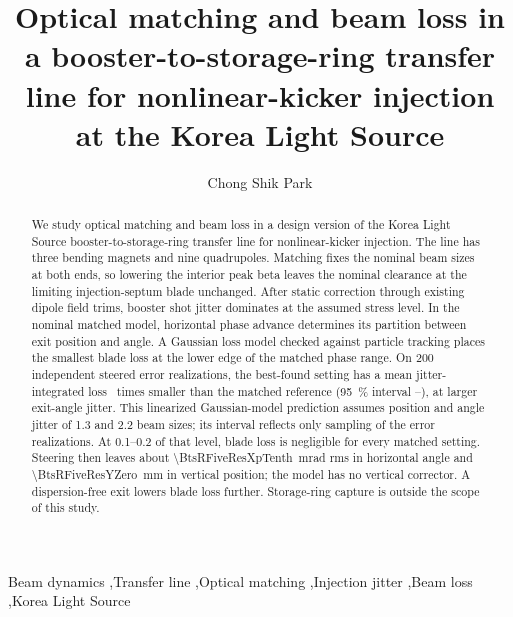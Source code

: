 \documentclass[final,5p,twocolumn]{elsarticle}
\begin{document}
\begin{frontmatter}
\title{Optical matching and beam loss in a booster-to-storage-ring transfer line for nonlinear-kicker injection at the Korea Light Source}
\author[department,center]{Chong Shik Park}
\address[department]{Department of Accelerator Science, Korea University, Sejong, 30019, Republic of Korea}
\address[center]{Center for Accelerator Research, Korea University, Sejong, 30019, Republic of Korea}
\begin{abstract}
We study optical matching and beam loss in a design version of the Korea Light
Source booster-to-storage-ring transfer line for nonlinear-kicker injection.
The line has three bending magnets and nine quadrupoles. Matching fixes the
nominal beam sizes at both ends, so lowering the interior peak beta leaves the
nominal clearance at the limiting injection-septum blade unchanged.
After static correction through existing dipole field trims, booster shot jitter
dominates at the assumed stress level. In the nominal matched model, horizontal
phase advance determines its partition between exit position and angle.
A Gaussian loss model checked against particle tracking places the smallest
blade loss at the lower edge of the matched phase range. On 200 independent
steered error realizations, the best-found setting has a mean jitter-integrated
loss \BtsRFiveGain\ times smaller than the matched reference
(\SI{95}{\percent} interval \BtsRFiveGainLo--\BtsRFiveGainHi), at larger exit-angle
jitter. This linearized Gaussian-model prediction assumes position and angle
jitter of 1.3 and 2.2 beam sizes; its interval reflects only sampling of the error
realizations. At 0.1--0.2 of that level, blade loss is negligible for every matched
setting. Steering then leaves about
\SI{\BtsRFiveResXpTenth}{\milli\radian} rms in horizontal angle and
\SI{\BtsRFiveResYZero}{\milli\metre} in vertical position; the model has no vertical
corrector. A dispersion-free exit lowers blade loss further. Storage-ring
capture is outside the scope of this study.
\end{abstract}
\begin{keyword}
Beam dynamics \sep Transfer line \sep Optical matching \sep Injection jitter \sep Beam loss \sep Korea Light Source
\end{keyword}
\end{frontmatter}
\thispagestyle{plain}
\end{document}
